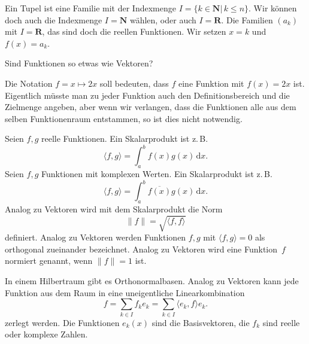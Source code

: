 \documentclass[a4paper,11pt,fleqn,twocolumn,twoside]{scrartcl}
\numberwithin{equation}{section}
\begin{document}
Ein Tupel ist eine Familie mit der Indexmenge
$I=\{k\in\mathbf N|\,k\leq n\}.$ Wir können doch auch die
Indexmenge $I=\mathbf N$ wählen, oder auch $I=\mathbf R$.
Die Familien $(a_k)$ mit $I=\mathbf R$, das sind doch die
reellen Funktionen. Wir setzen $x=k$ und $f(x)=a_k$.

Sind Funktionen so etwas wie Vektoren?

Die Notation $f=x\mapsto 2x$ soll bedeuten, dass $f$ eine
Funktion mit $f(x)=2x$ ist. Eigentlich müsste man zu jeder Funktion
auch den Definitionsbereich und die Zielmenge angeben, aber wenn
wir verlangen, dass die Funktionen alle aus dem selben Funktionenraum
entstammen, so ist dies nicht notwendig.

Seien $f,g$ reelle Funktionen. Ein Skalarprodukt ist z.\,B.
\begin{equation}
\langle f,g\rangle = \int_a^b f(x)g(x)\,\mathrm dx.
\end{equation}
Seien $f,g$ Funktionen mit komplexen Werten.
Ein Skalarprodukt ist z.\,B.
\begin{equation}
\langle f,g\rangle = \int_a^b \overline{f(x)}g(x)\,\mathrm dx.
\end{equation}
Analog zu Vektoren wird mit dem Skalarprodukt die Norm
\begin{equation}
\|f\| = \sqrt{\langle f,f\rangle}
\end{equation}
definiert. Analog zu Vektoren werden Funktionen $f,g$ mit
$\langle f,g\rangle=0$ als orthogonal zueinander bezeichnet.
Analog zu Vektoren wird eine Funktion~$f$ normiert genannt,
wenn $\|f\|=1$ ist.

In einem Hilbertraum gibt es Orthonormalbasen. Analog zu Vektoren
kann jede Funktion aus dem Raum in eine uneigentliche
Linearkombination
\begin{equation}
f = \sum_{k\in I} f_ke_k = \sum_{k\in I} \langle e_k,f\rangle e_k.
\end{equation}
zerlegt werden. Die Funktionen $e_k(x)$ sind die Basisvektoren,
die $f_k$ sind reelle oder komplexe Zahlen.
\end{document}
